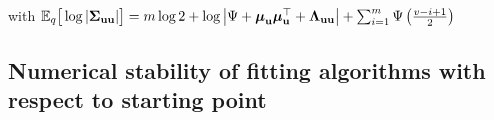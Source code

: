 \documentclass{article}[12pt]
\begin{document}
	with ${\mathbb E}_q \big[ \log |{\boldsymbol \Sigma}_{{\bf u} {\bf u}}| \big] = m \log 2 + \log \left | \Psi + {\boldsymbol \mu}_{\bf u} {\boldsymbol \mu}_{\bf u}^\top + {\boldsymbol \Lambda}_{{\bf u} {\bf u}} \right | + \sum_{i=1}^m \Psi \left ( \frac{v - i + 1}{2} \right )$
	
	\subsection{Numerical stability of fitting algorithms with respect to starting point}
	
	
	
	
	
\end{document}
